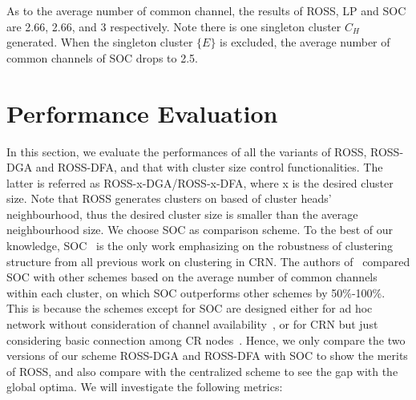 As to the average number of common channel, the results of ROSS, LP and SOC are 2.66, 2.66, and 3 respectively. 
Note there is one singleton cluster $C_H$ generated.
When the singleton cluster $\{E\}$ is excluded, the average number of common channels of SOC drops to 2.5. 




\section{Performance Evaluation}
\label{performance}
In this section, we evaluate the performances of all the variants of ROSS, \ie ROSS-DGA and ROSS-DFA, and that with cluster size control functionalities.
The latter is referred as ROSS-x-DGA/ROSS-x-DFA, where x is the desired cluster size.
Note that ROSS generates clusters on based of cluster heads' neighbourhood, thus the desired cluster size is smaller than the average neighbourhood size.
We choose SOC as comparison scheme.
To the best of our knowledge, SOC~\cite{Lazos09} is the only work emphasizing on the robustness of clustering structure from all previous work on clustering in CRN. The authors of~\cite{Lazos09} compared SOC with other schemes based on the average number of common channels within each cluster, on which SOC outperforms other schemes by 50\%-100\%. This is because the schemes except for SOC are designed either for ad hoc network without consideration of channel availability~\cite{Basagni99}, or for CRN  but just considering basic connection among CR nodes~\cite{Zhao07}. Hence, we only compare the two versions of our scheme ROSS-DGA and ROSS-DFA with SOC to show the merits of ROSS, and also compare with the centralized scheme to see the gap with the global optima. 
We will investigate the following metrics:

